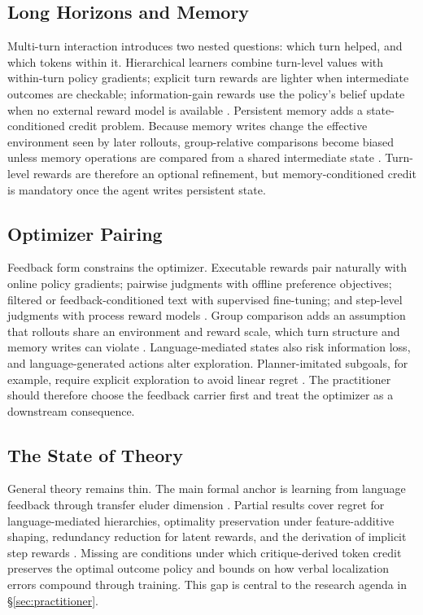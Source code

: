 \subsection{Long Horizons and Memory}
\label{subsec:credit-multiturn}

Multi-turn interaction introduces two nested questions: which turn helped, and which tokens within it. Hierarchical learners combine turn-level values with within-turn policy gradients; explicit turn rewards are lighter when intermediate outcomes are checkable; information-gain rewards use the policy's belief update when no external reward model is available \citep{zhou2024archer,wei2025reinforcing,wang2025information}. Persistent memory adds a state-conditioned credit problem. Because memory writes change the effective environment seen by later rollouts, group-relative comparisons become biased unless memory operations are compared from a shared intermediate state \citep{zhou2025memento,yan2026memoryr2}. Turn-level rewards are therefore an optional refinement, but memory-conditioned credit is mandatory once the agent writes persistent state.

\subsection{Optimizer Pairing}
\label{subsec:credit-algorithms}

Feedback form constrains the optimizer. Executable rewards pair naturally with online policy gradients; pairwise judgments with offline preference objectives; filtered or feedback-conditioned text with supervised fine-tuning; and step-level judgments with process reward models \citep{schulman2017proximal,rafailov2023direct,luo2025fcp,lightman2024let}. Group comparison adds an assumption that rollouts share an environment and reward scale, which turn structure and memory writes can violate \citep{guo2025deepseek,wei2025reinforcing,yan2026memoryr2}. Language-mediated states also risk information loss, and language-generated actions alter exploration. Planner-imitated subgoals, for example, require explicit exploration to avoid linear regret \citep{he2024words}. The practitioner should therefore choose the feedback carrier first and treat the optimizer as a downstream consequence.

\subsection{The State of Theory}
\label{subsec:credit-theory}

General theory remains thin. The main formal anchor is learning from language feedback through transfer eluder dimension \citep{xu2025formalizing}. Partial results cover regret for language-mediated hierarchies, optimality preservation under feature-additive shaping, redundancy reduction for latent rewards, and the derivation of implicit step rewards \citep{he2024words,koo2025learning,qu2024latent,liu2025agenticreinforcementlearningimplicit}. Missing are conditions under which critique-derived token credit preserves the optimal outcome policy and bounds on how verbal localization errors compound through training. This gap is central to the research agenda in \S\ref{sec:practitioner}.
